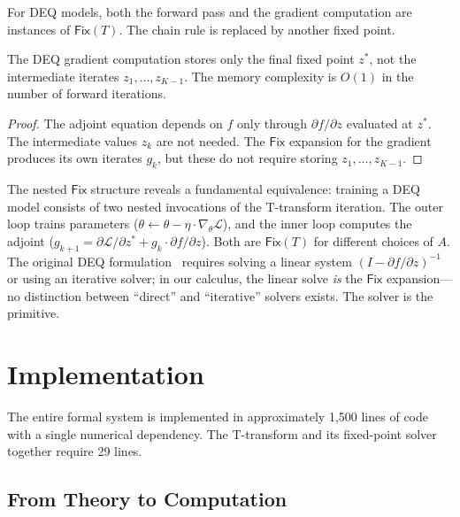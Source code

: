 \documentclass{lmcs}
\theoremstyle{plain}
\theoremstyle{definition}
\newcommand{\fix}{\mathsf{Fix}}
\begin{document}
\begin{cor}\label{cor:fb-unif}
For DEQ models, both the forward pass and the gradient computation are
instances of $\fix(T)$. The chain rule is replaced by another fixed point.
\end{cor}

\begin{thm}\label{thm:deq-memory}
The DEQ gradient computation stores only the final fixed point $z^*$, not
the intermediate iterates $z_1, \dots, z_{K-1}$. The memory complexity is
$O(1)$ in the number of forward iterations.
\end{thm}

\begin{proof}
The adjoint equation depends on $f$ only through $\partial f/\partial z$
evaluated at $z^*$. The intermediate values $z_k$ are not needed. The
$\fix$ expansion for the gradient produces its own iterates $g_k$, but
these do not require storing $z_1, \dots, z_{K-1}$.
\end{proof}

The nested $\fix$ structure reveals a fundamental equivalence: training a
DEQ model consists of two nested invocations of the T-transform iteration.
The outer loop trains parameters ($\theta \leftarrow \theta - \eta \cdot
\nabla_\theta \mathcal{L}$), and the inner loop computes the adjoint
($g_{k+1} = \partial \mathcal{L}/\partial z^* + g_k \cdot \partial
f/\partial z$). Both are $\fix(T)$ for different choices of $A$. The
original DEQ formulation~\cite{bai2019} requires solving a linear system
$(I - \partial f/\partial z)^{-1}$ or using an iterative solver; in our
calculus, the linear solve \emph{is} the $\fix$ expansion---no distinction
between ``direct'' and ``iterative'' solvers exists. The solver is the
primitive.

\section{Implementation}\label{sec:implementation}

The entire formal system is implemented in approximately 1,500 lines of
code with a single numerical dependency. The T-transform and its fixed-point
solver together require 29 lines.

\subsection{From Theory to Computation}
\end{document}
